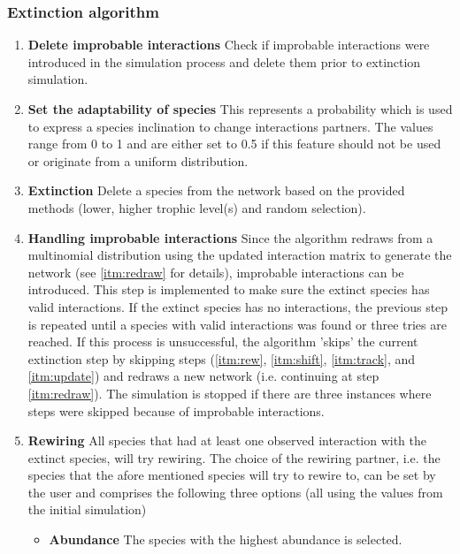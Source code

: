\documentclass[12pt,a4paper]{article}
\begin{document}
\subsubsection{Extinction algorithm} \label{subsec:extc_alg}
\begin{enumerate} 
	\item \textbf{Delete improbable interactions} {\small Check if improbable interactions were introduced in the simulation process and delete them prior to extinction simulation.}
	\item \textbf{Set the adaptability of species} {\small This represents a probability which is used to express a species inclination to change interactions partners. The values range from 0 to 1 and are either set to 0.5 if this feature should not be used or originate from a uniform distribution.}
	\item \label{itm:etxc} \textbf{Extinction} {\small Delete a species from the network based on the provided methods (lower, higher trophic level(s) and random selection).}
	\item \label{itm:failsafe} \textbf{Handling improbable interactions} {\small Since the algorithm redraws from a multinomial distribution using the updated interaction matrix to generate the network (see \ref{itm:redraw} for details), improbable interactions can be introduced. This step is implemented to make sure the extinct species has valid interactions. If the extinct species has no interactions, the previous step is repeated until a species with valid interactions was found or three tries are reached. If this process is unsuccessful, the algorithm 'skips' the current extinction step by skipping steps (\ref{itm:rew}, \ref{itm:shift}, \ref{itm:track}, and \ref{itm:update}) and redraws a new network (i.e. continuing at step \ref{itm:redraw}). The simulation is stopped if there are three instances where steps were skipped because of improbable interactions.}
	\item \label{itm:rew} \textbf{Rewiring} {\small All species that had at least one observed interaction with the extinct species, will try rewiring. The choice of the rewiring partner, i.e. the species that the afore mentioned species will try to rewire to, can be set by the user and comprises the following three options (all using the values from the initial simulation)}
		\begin{itemize}
		\item \label{itm:abund_rew} \textbf{Abundance} {\small The species with the highest abundance is selected.}

\end{itemize}
\end{enumerate}
\end{document}
